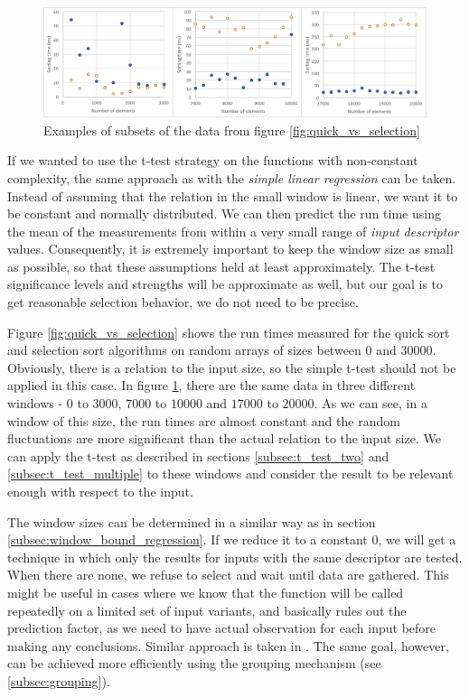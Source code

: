 \begin{figure}[h!]
	\captionsetup{justification=centering,margin=0.5cm}
	\centerline{\mbox{\includegraphics[width=150mm]{./img/window_t_test_examples.png}}}
	\caption{Examples of subsets of the data from figure \ref{fig:quick_vs_selection}}
	\label{fig:window_t_test_examples}
\end{figure}

If we wanted to use the t-test strategy on the functions with non-constant complexity, the same approach as with the \textit{simple linear regression} can be taken. Instead of assuming that the relation in the small window is linear, we want it to be constant and normally distributed. We can then predict the run time using the mean of the measurements from within a very small range of \textit{input descriptor} values. Consequently, it is extremely important to keep the window size as small as possible, so that these assumptions held at least approximately. The t-test significance levels and strengths will be approximate as well, but our goal is to get reasonable selection behavior, we do not need to be precise.

Figure \ref{fig:quick_vs_selection} shows the run times measured for the quick sort and selection sort algorithms on random arrays of sizes between $0$ and $30000$. Obviously, there is a relation to the input size, so the simple t-test should not be applied in this case. In figure \ref{fig:window_t_test_examples}, there are the same data in three different windows - $0$ to $3000$, $7000$ to $10000$ and $17000$ to $20000$. As we can see, in a window of this size, the run times are almost constant and the random fluctuations are more significant than the actual relation to the input size. We can apply the t-test as described in sections \ref{subsec:t_test_two} and \ref{subsec:t_test_multiple} to these windows and consider the result to be relevant enough with respect to the input.

The window sizes can be determined in a similar way as in section \ref{subsec:window_bound_regression}. If we reduce it to a constant 0, we will get a technique in which only the results for inputs with the same descriptor are tested. When there are none, we refuse to select and wait until data are gathered. This might be useful in cases where we know that the function will be called repeatedly on a limited set of input variants, and basically rules out the prediction factor, as we need to have actual observation for each input before making any conclusions. Similar approach is taken in \cite{bulej_performance_2012}. The same goal, however, can be achieved more efficiently using the grouping mechanism (see \ref{subsec:grouping}).

